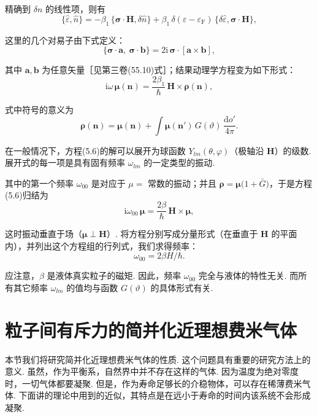 精确到 $\delta n$ 的线性项，则有
\begin{equation*}
\{\hat\varepsilon,\hat n\}
=-\beta_{1}\,\{\bm\sigma\cdot\bm H,\delta\hat n\}
+\beta_{1}\,\delta(\varepsilon-\varepsilon_{\mathrm F})\,\{\delta\hat\varepsilon,\bm\sigma\cdot\bm H\},
\end{equation*}

这里的几个对易子由下式定义：
\begin{equation*}
\{\bm\sigma\cdot\bm a,\ \bm\sigma\cdot\bm b\}=2\mathrm{i}\,\bm\sigma\cdot[\bm a\times\bm b],
\end{equation*}

其中 $\bm a,\bm b$ 为任意矢量［见第三卷(55.10)式］；结果动理学方程变为如下形式：
\begin{equation}
\mathrm{i}\omega\,\bm\mu(\bm n)=\frac{2\beta_{1}}{\hbar}\,\bm H\times\bm\rho(\bm n),
\end{equation}

式中符号的意义为
\begin{equation}
\bm\rho(\bm n)=\bm\mu(\bm n)+\int\bm\mu(\bm n')\,G(\vartheta)\,\frac{\mathrm{d}o'}{4\pi}.
\end{equation}

在一般情况下，方程(5.6)的解可以展开为球函数 $Y_{lm}(\theta,\varphi)$（极轴沿 $\bm H$）的级数. 展开式的每一项是具有固有频率 $\omega_{lm}$ 的一定类型的振动.

其中的第一个频率 $\omega_{00}$ 是对应于 $\mu=$ 常数的振动；并且 $\bm\rho=\bm\mu\bigl(1+\bar G\bigr)$，于是方程(5.6)归结为
\begin{equation*}
\mathrm{i}\omega_{00}\,\bm\mu=\frac{2\beta}{\hbar}\,\bm H\times\bm\mu,
\end{equation*}

这时振动垂直于场（$\bm\mu\perp\bm H$）. 将方程分别写成分量形式（在垂直于 $\bm H$ 的平面内），并列出这个方程组的行列式，我们求得频率：
\begin{equation}
\omega_{00}=2\beta H/\hbar.
\end{equation}

应注意，$\beta$ 是液体真实粒子的磁矩. 因此，频率 $\omega_{00}$ 完全与液体的特性无关. 而所有其它频率 $\omega_{lm}$ 的值均与函数 $G(\vartheta)$ 的具体形式有关.

\section{粒子间有斥力的简并化近理想费米气体}

本节我们将研究简并化近理想费米气体的性质. 这个问题具有重要的研究方法上的意义. 虽然，作为平衡系，自然界中并不存在这样的气体. 因为温度为绝对零度时，一切气体都要凝聚. 但是，作为寿命足够长的介稳物体，可以存在稀薄费米气体. 下面讲的理论中用到的近似，其特点是在远小于寿命的时间内该系统不会形成凝聚.

